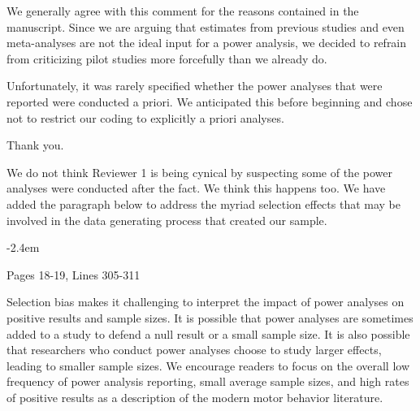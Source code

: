 \documentclass[final]{article}
\renewenvironment{quote}{\begin{fquote}\advance\leftmargini -2.4em\begin{oldquote}}{\end{oldquote}\end{fquote}}
\newenvironment{fquote}
  {\def\FrameCommand{
	\fboxsep=0.6em %
	\fcolorbox{black}{white}}%
    \MakeFramed {\advance\hsize-2\width \FrameRestore}
    \begin{minipage}{\linewidth}
  }
  {\end{minipage}\endMakeFramed}
\begin{document}
We generally agree with this comment for the reasons contained in the manuscript. Since we are arguing that estimates from previous studies and even meta-analyses are not the ideal input for a power analysis, we decided to refrain from criticizing pilot studies more forcefully than we already do.


Unfortunately, it was rarely specified whether the power analyses that were reported were conducted a priori. We anticipated this before beginning and chose not to restrict our coding to explicitly a priori analyses.


Thank you.


We do not think Reviewer 1 is being cynical by suspecting some of the power analyses were conducted after the fact. We think this happens too. We have added the paragraph below to address the myriad selection effects that may be involved in the data generating process that created our sample.

\begin{quote}
Pages 18-19, Lines 305-311

Selection bias makes it challenging to interpret the impact of power analyses on positive results and sample sizes. It is possible that power analyses are sometimes added to a
study to defend a null result or a small sample size. It is also possible that researchers who conduct power analyses choose to study larger effects, leading to smaller sample sizes. We encourage readers to focus on the overall low frequency of power analysis reporting, small average sample sizes, and high rates of positive results as a description of the modern motor behavior literature.
\end{quote}
\end{document}
